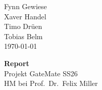 \documentclass[a4paper,11pt]{article}
\begin{document}
\begin{titlepage}
	\thispagestyle{empty}
	\begin{flushright}
		\setlength{\fboxsep}{8pt}
		\begin{minipage}{0.4\textwidth}
			\raggedleft
			Fynn Gewiese\\
			Xaver Handel\\
			Timo Drüen\\
			Tobias Belm\\
			\today
		\end{minipage}
	\end{flushright}
	\vspace{2\baselineskip}
	\begin{center}
		\vspace*{5\baselineskip}
		{\textcolor{sections}{\Huge\bfseries Report\\}}
		\vspace{0.5\baselineskip}
		{\Large Projekt GateMate SS26\\}
		\vspace{0.3\baselineskip}
		{\large HM bei Prof.\ Dr.\ Felix Miller}
		\vspace{2\baselineskip}
	\end{center}
	\vfill
\end{titlepage}
\newpage
{}
\setcounter{page}{2}
\end{document}
